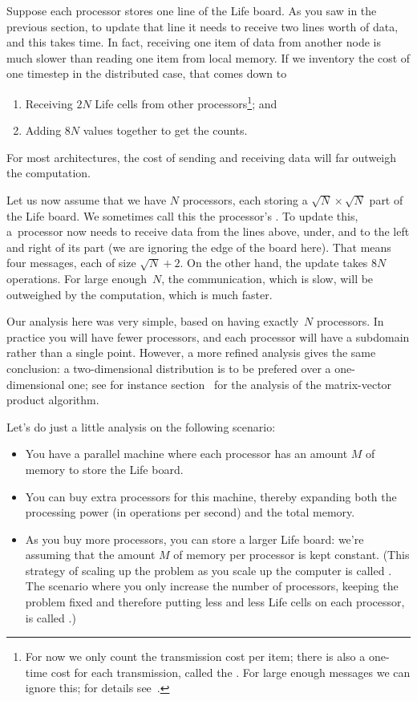 Suppose each processor stores one line of the Life board. 
As you saw in the previous section, to update that line it needs to receive
two lines worth of data, and this takes time.
In fact, receiving one item of data from another node is much slower
than reading one item from local memory. If we inventory the cost 
of one timestep in the distributed case, that comes down to
\begin{enumerate}
\item Receiving $2N$ Life cells from other processors\footnote{For now
  we only count the transmission cost per item; there is also a
  one-time cost for each transmission, called the . For large enough messages we
  can ignore this; for details see~.}; and
\item Adding $8N$ values together to get the counts.
\end{enumerate}
For most architectures, the cost of sending and receiving data will
far outweigh the computation.

Let us now assume that we have $N$ processors, each storing a $\sqrt
N\times\sqrt N$ part of the Life board. We sometimes call this 
the processor's .
To update this, a~processor
now needs to receive data from the lines above, under, and to the left
and right of its part (we are ignoring the edge of the board here).
That means four messages, each of size $\sqrt N+2$.
On the other hand, the update takes $8N$ operations. For large enough~$N$,
the communication, which is slow, will be outweighed by the computation,
which is much faster.

Our analysis here was very simple, based on having exactly~$N$ processors.
In practice you will have fewer processors, and each processor will
have a subdomain rather than a single point.
However, a more refined analysis gives the same conclusion:
a two-dimensional distribution is to be prefered over a one-dimensional one;
see for instance section~ for the analysis
of the matrix-vector product algorithm.

Let's do just a little analysis on the following scenario:
\begin{itemize}
\item You have a parallel machine where each processor has an amount
  $M$ of memory to store the Life board.
\item You can buy extra processors for this machine, thereby expanding
  both the processing power (in operations per second) and the total
  memory.
\item As you buy more processors, you can store a larger Life board:
  we're assuming that the amount $M$ of memory per processor is kept constant. (This
  strategy of scaling up the problem as you scale up the computer is
  called . The scenario where you only
  increase the number of processors, keeping the problem fixed and
  therefore putting less and less Life cells on each processor,
  is called .)
\end{itemize}

